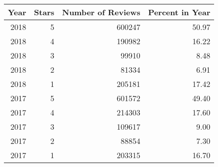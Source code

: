 \begin{tabular}{rrrr}
\toprule
 Year &  Stars &  Number of Reviews &  Percent in Year \\
\midrule
 2018 &      5 &             600247 &            50.97 \\
 2018 &      4 &             190982 &            16.22 \\
 2018 &      3 &              99910 &             8.48 \\
 2018 &      2 &              81334 &             6.91 \\
 2018 &      1 &             205181 &            17.42 \\
 2017 &      5 &             601572 &            49.40 \\
 2017 &      4 &             214303 &            17.60 \\
 2017 &      3 &             109617 &             9.00 \\
 2017 &      2 &              88854 &             7.30 \\
 2017 &      1 &             203315 &            16.70 \\
\bottomrule
\end{tabular}
